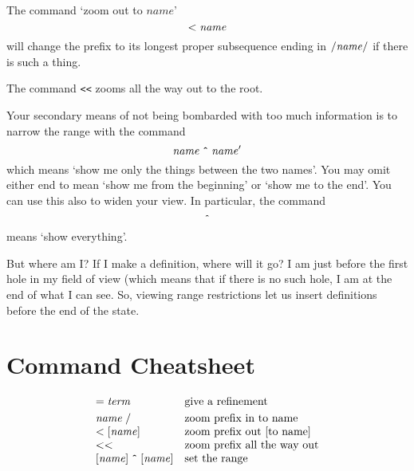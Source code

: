 \documentclass{article}
\begin{document}
The command `zoom out to $\mathit{name}$'
\[
{\tt <}\;\mathit{name}
\]
will change the prefix to its longest proper subsequence ending in
${\tt /}\mathit{name}{\tt /}$
if there is such a thing.

The command {\tt <<} zooms all the way out to the root.

Your secondary means of not being bombarded with too much information is to narrow
the range with the command
\[
\mathit{name}\;\mbox{\tt \^{}}\;\mathit{name}'
\]
which means `show me only the things between the two names'. You may omit either end
to mean `show me from the beginning' or `show me to the end'. You can use this also to
widen your view. In particular, the command
\[
\mbox{\tt \^{}}
\]
means `show everything'.

But where am I? If I make a definition, where will it go? I am just before
the first hole in my field of view (which means that if there is no such hole, I am at the
end of what I can see. So, viewing range restrictions let us insert definitions
before the end of the state.



\newpage\appendix

\section{Command Cheatsheet}

\[\begin{array}{ll}
{\tt =}\;\mathit{term} & \mbox{give a refinement} \smallskip\\

\mathit{name}\;{\tt /} & \mbox{zoom prefix in to name}\\
{\tt <}\;[\mathit{name}] & \mbox{zoom prefix out [to name]}\\
{\tt <<} & \mbox{zoom prefix all the way out}\\
{}[\mathit{name}]\;\mbox{\tt \^{}}\;[\mathit{name}] & \mbox{set the range}\\
\end{array}\]
\end{document}
